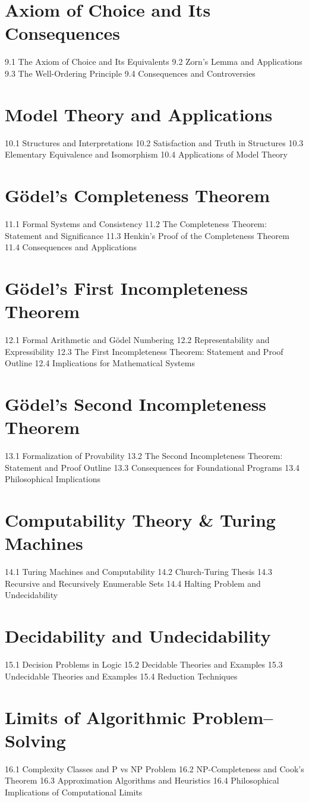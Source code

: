 \section{Axiom of Choice and Its Consequences}
9.1 The Axiom of Choice and Its Equivalents
9.2 Zorn's Lemma and Applications
9.3 The Well-Ordering Principle
9.4 Consequences and Controversies
\section{Model Theory and Applications}
10.1 Structures and Interpretations
10.2 Satisfaction and Truth in Structures
10.3 Elementary Equivalence and Isomorphism
10.4 Applications of Model Theory
\section{Gödel's Completeness Theorem}
11.1 Formal Systems and Consistency
11.2 The Completeness Theorem: Statement and Significance
11.3 Henkin's Proof of the Completeness Theorem
11.4 Consequences and Applications
\section{Gödel's First Incompleteness Theorem}
12.1 Formal Arithmetic and Gödel Numbering
12.2 Representability and Expressibility
12.3 The First Incompleteness Theorem: Statement and Proof Outline
12.4 Implications for Mathematical Systems
\section{Gödel's Second Incompleteness Theorem}
13.1 Formalization of Provability
13.2 The Second Incompleteness Theorem: Statement and Proof Outline
13.3 Consequences for Foundational Programs
13.4 Philosophical Implications
\section{Computability Theory \& Turing Machines}
14.1 Turing Machines and Computability
14.2 Church-Turing Thesis
14.3 Recursive and Recursively Enumerable Sets
14.4 Halting Problem and Undecidability
\section{Decidability and Undecidability}
15.1 Decision Problems in Logic
15.2 Decidable Theories and Examples
15.3 Undecidable Theories and Examples
15.4 Reduction Techniques
\section{Limits of Algorithmic Problem–Solving}
16.1 Complexity Classes and P vs NP Problem
16.2 NP-Completeness and Cook's Theorem
16.3 Approximation Algorithms and Heuristics
16.4 Philosophical Implications of Computational Limits
